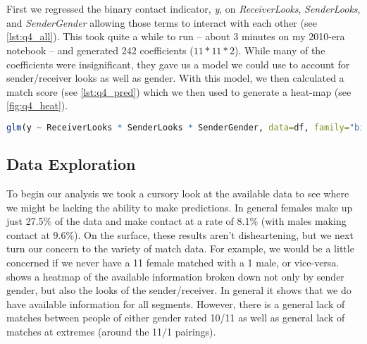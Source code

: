 


\section{}
First we regressed the binary contact indicator, \textit{y}, on \textit{ReceiverLooks}, \textit{SenderLooks}, and \textit{SenderGender} allowing those terms to interact with each other (see \vref{lst:q4_all}).  This took quite a while to run -- about 3 minutes on my 2010-era notebook -- and generated 242 coefficients ($11 * 11 * 2$).  While many of the coefficients were insignificant, they gave us a model we could use to account for sender/receiver looks as well as gender.  With this model, we then calculated a match score (see \vref{lst:q4_pred}) which we then used to generate a heat-map (see \vref{fig:q4_heat}).

\begin{lstlisting}[language=R,label=lst:q4_all,caption=Regressing y on all available data.]
glm(y ~ ReceiverLooks * SenderLooks * SenderGender, data=df, family="binomial")
\end{lstlisting}



\clearpage
\begin{appendices}

\section{Data Exploration} \label{app:1}
To begin our analysis we took a cursory look at the available data to see where we might be lacking the ability to make predictions.  In general females make up just 27.5\% of the data and make contact at a rate of 8.1\% (with males making contact at 9.6\%).  On the surface, these results aren't disheartening, but we next turn our concern to the variety of match data.  For example, we would be a little concerned if we never have a 11 female matched with a 1 male, or vice-versa.  shows  a heatmap of the available information broken down not only by sender gender, but also the looks of the sender/receiver.  In general it shows that we do have available information for all segments.  However, there is a general lack of matches between people of either gender rated 10/11 as well as general lack of matches at extremes (around the 11/1 pairings).



\end{appendices}



